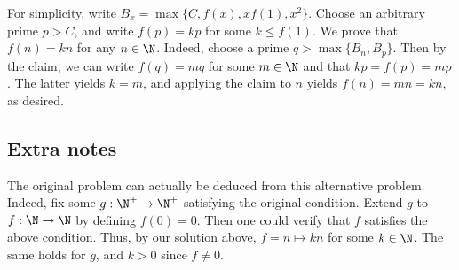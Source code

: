 For simplicity, write $B_x = \max\{C, f(x), x f(1), x^2\}$.
Choose an arbitrary prime $p > C$, and write $f(p) = kp$ for some $k \leq f(1)$.
We prove that $f(n) = kn$ for any $n \in \N$.
Indeed, choose a prime $q > \max\{B_n, B_p\}$.
Then by the claim, we can write $f(q) = mq$ for some $m \in \N$ and that $kp = f(p) = mp$.
The latter yields $k = m$, and applying the claim to $n$ yields $f(n) = mn = kn$, as desired.



\subsection*{Extra notes}

The original problem can actually be deduced from this alternative problem.
Indeed, fix some $g : \N^+ \to \N^+$ satisfying the original condition.
Extend $g$ to $f : \N \to \N$ by defining $f(0) = 0$.
Then one could verify that $f$ satisfies the above condition.
Thus, by our solution above, $f = n \mapsto kn$ for some $k \in \N$.
The same holds for $g$, and $k > 0$ since $f \neq 0$.
